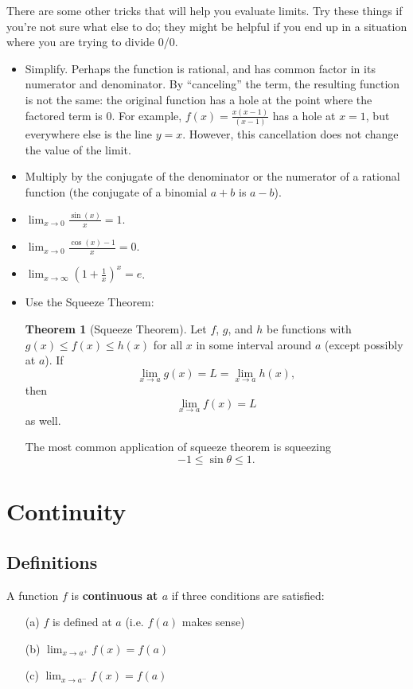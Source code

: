 \documentclass{article}
\theoremstyle{definition}
\newtheorem{theorem}{Theorem}[section]
\theoremstyle{definition}
\newenvironment{thm}[1][]{
\begin{tcolorbox}[colback=white!97!black, arc=0in]
\begin{theorem}[#1]
}{
\end{theorem}
\end{tcolorbox}
}
\begin{document}
There are some other tricks that will help you evaluate limits. Try these things if you're not sure what else to do; they might be helpful if you end up in a situation where you are trying to divide 0/0.
\begin{itemize}
\item Simplify. Perhaps the function is rational, and has common factor in its numerator and denominator. By ``canceling'' the term, the resulting function is not the same: the original function has a hole at the point where the factored term is 0. For example, $f(x)=\frac{x(x-1)}{(x-1)}$ has a hole at $x=1$, but everywhere else is the line $y=x$. However, this cancellation does not change the value of the limit.
\item Multiply by the conjugate of the denominator or the numerator of a rational function (the conjugate of a binomial $a+b$ is $a-b$).
\item $\displaystyle\lim_{x\to 0}\frac{\sin(x)}{x} = 1$.
\item $\displaystyle\lim_{x\to 0}\frac{\cos(x) - 1}{x} = 0$.
\item $\displaystyle\lim_{x\to\infty}\left(1+\frac{1}{x}\right)^x = e$.

\item Use the Squeeze Theorem:

\begin{thm}[Squeeze Theorem]
Let $f$, $g$, and $h$ be functions with $g(x)\leq f(x)\leq h(x)$ for all $x$ in some interval around $a$ (except possibly at $a$). If $$\lim_{x\to a}g(x)=L=\lim_{x\to a} h(x),$$ then $$\lim_{x\to a} f(x)=L$$
as well.
\end{thm}
The most common application of squeeze theorem is squeezing $$-1\leq \sin\theta \leq 1.$$
\end{itemize}


\section{Continuity}

\subsection{Definitions}

A function $f$ is \textbf{continuous at $a$} if three conditions are satisfied:
\begin{enumerate}
\item[(a)] $f$ is defined at $a$ (i.e. $f(a)$ makes sense)
\item[(b)] $\displaystyle\lim_{x\to a^+} f(x)= f(a)$
\item[(c)] $\displaystyle\lim_{x\to a^-} f(x)= f(a)$
\end{enumerate}
\end{document}
